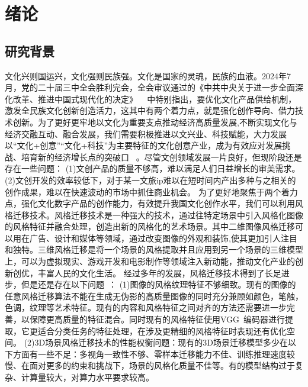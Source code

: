 \chapter{绪论}

\section{研究背景}
\indent
文化兴则国运兴，文化强则民族强。文化是国家的灵魂，民族的血液。2024年7月，党的二十届三中全会胜利完会，全会审议通过的《中共中央关于进一步全面深化改革、推进中国式现代化的决定》 ~\cite{xjptheory1} 中特别指出，要优化文化产品供给机制，激发全民族文化创新创造活力，这其中有两个着力点，就是强化创作导向、借力技术创新。为了更好更牢地以文化为重要支点推动经济高质量发展,不断实现文化与经济交融互动、融合发展，我们需要积极推进以文兴业、科技赋能，大力发展以“文化+创意”“文化+科技”为主要特征的文化创意产业，成为有效应对发展挑战、培育新的经济增长点的突破口~\cite{theory2} 。尽管文创领域发展一片良好，但现阶段还是存在一些问题：
\newline \indent
(1)文创产品的质量不够高，难以满足人们日益增长的审美需求。
\newline \indent
(2)文创开发的效率较低下，对于某一文旅ip难以在短时间内产出多种与之相关的创作成果，难以在快速波动的市场中抓住商业机会。
\newline \indent
为了更好地聚焦于两个着力点，强化文化数字产品的创作能力，有效提升我国文化创作水平，我们可以利用风格迁移技术。风格迁移技术是一种强大的技术，通过往特定场景中引入风格化图像的风格特征并融合处理，创造出新的风格化的艺术场景。其中二维图像风格迁移可以用在广告、设计和媒体等领域，通过改变图像的外观和装饰,使其更加引人注目和独特。三维风格迁移是将一个场景的风格提取并且应用到另一个场景的三维模型上，可以为虚拟现实、游戏开发和电影制作等领域注入新动能，推动文化产业的创新创优，丰富人民的文化生活。
\newline \indent
经过多年的发展，风格迁移技术得到了长足进步，但是还是存在以下问题~\cite{jing2019neural}：
\newline \indent
(1)图像的风格纹理特征不够细致。现有的图像的任意风格迁移算法不能在生成无伪影的高质量图像的同时充分兼顾如颜色，笔触，色调，纹理等艺术特征。现有的内容和风格特征之间对齐的方法还需要进一步完善，以保障更高质量的特征混合。同时现有的风格特征使用VGG~\cite{simonyan2014very}编码器进行提取，它更适合分类任务的特征处理，在涉及更精细的风格特征时表现还有优化空间。
\newline \indent
(2)3D场景风格迁移技术的性能权衡问题：现有的3D场景迁移模型多少在以下方面有一些不足：多视角一致性不够、零样本迁移能力不佳、训练推理速度较慢、在面对更多的约束和挑战下，场景的风格化质量不佳等。有的模型结构过于复杂、计算量较大，对算力水平要求较高。


